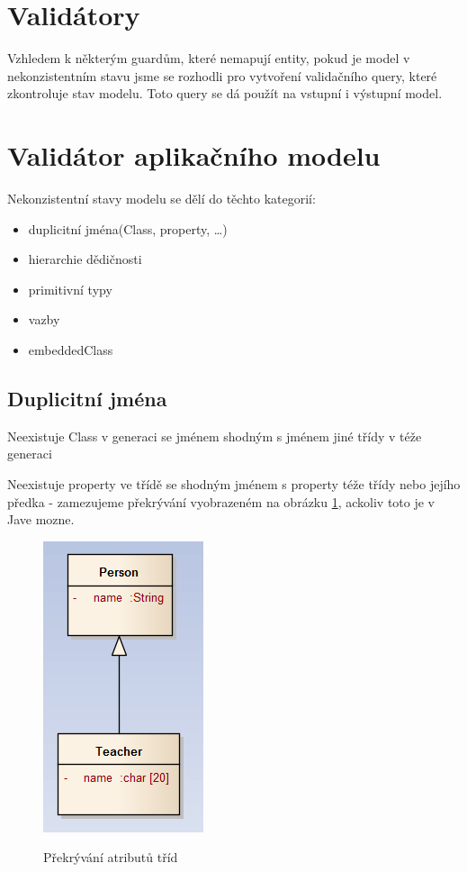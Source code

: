 \documentclass{article}
\begin{document}
\section{Validátory}
Vzhledem k některým guardům, které nemapují entity, pokud je model v
nekonzistentním stavu jsme se rozhodli pro vytvoření validačního query, které
zkontroluje stav modelu. Toto query se dá použít na vstupní  i výstupní model.

\section{Validátor aplikačního modelu}
Nekonzistentní stavy modelu se dělí do těchto kategorií:
\begin{itemize}
  \item duplicitní jména(Class, property, \ldots)
  \item hierarchie dědičnosti
  \item primitivní typy
  \item vazby
  \item embeddedClass
\end{itemize}

\subsection{Duplicitní jména}
Neexistuje Class v generaci se jménem shodným s jménem jiné třídy v téže
generaci \newline

Neexistuje property ve třídě se shodným jménem s property téže třídy nebo jejího
předka - zamezujeme překrývání vyobrazeném na obrázku
\ref{pict:prekryvani_atributu}, ackoliv toto je v Jave mozne.

\begin{figure}[th]
	\begin{center}
	\label{pict:prekryvani_atributu}		             
    \includegraphics[scale=1.0]{../images/prekryvani_atributu.png}
	\caption{Překrývání atributů tříd}
	\end{center}			     
\end{figure}
\end{document}
